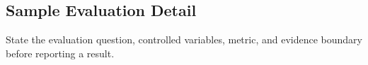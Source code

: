 \subsection{Sample Evaluation Detail}
\label{sec:sample-evaluation-detail}

State the evaluation question, controlled variables, metric, and evidence boundary before reporting a result.
